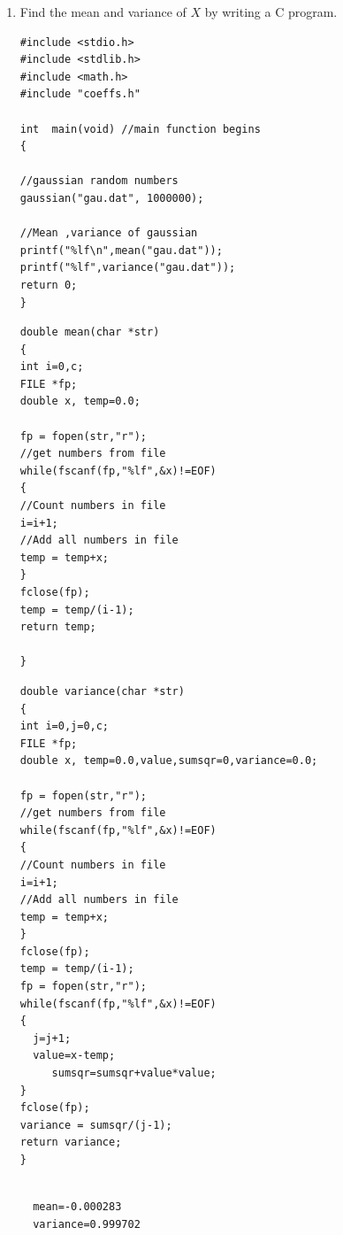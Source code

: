 \documentclass[10pt, a4paper]{article}
\begin{document}
\begin{enumerate}
 \item Find the mean and variance of $X$ by writing a C program.
\begin{lstlisting}
#include <stdio.h>
#include <stdlib.h>
#include <math.h>
#include "coeffs.h"

int  main(void) //main function begins
{
 
//gaussian random numbers
gaussian("gau.dat", 1000000);

//Mean ,variance of gaussian
printf("%lf\n",mean("gau.dat"));
printf("%lf",variance("gau.dat"));
return 0;
}
\end{lstlisting}
\begin{lstlisting}
double mean(char *str)
{
int i=0,c;
FILE *fp;
double x, temp=0.0;

fp = fopen(str,"r");
//get numbers from file
while(fscanf(fp,"%lf",&x)!=EOF)
{
//Count numbers in file
i=i+1;
//Add all numbers in file
temp = temp+x;
}
fclose(fp);
temp = temp/(i-1);
return temp;

}
\end{lstlisting}
\begin{lstlisting}
double variance(char *str)
{
int i=0,j=0,c;
FILE *fp;
double x, temp=0.0,value,sumsqr=0,variance=0.0;

fp = fopen(str,"r");
//get numbers from file
while(fscanf(fp,"%lf",&x)!=EOF)
{
//Count numbers in file
i=i+1;
//Add all numbers in file
temp = temp+x;
}
fclose(fp);
temp = temp/(i-1);
fp = fopen(str,"r");
while(fscanf(fp,"%lf",&x)!=EOF)
{
  j=j+1;
  value=x-temp;
     sumsqr=sumsqr+value*value;
}
fclose(fp);
variance = sumsqr/(j-1);
return variance;
}


\end{lstlisting}

\begin{lstlisting}
  mean=-0.000283
  variance=0.999702
\end{lstlisting}

\begin{center}
\end{center}


\end{enumerate}
\end{document}
